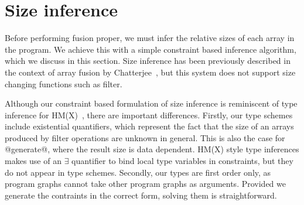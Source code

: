 \section{Size inference}
Before performing fusion proper, we must infer the relative sizes of each array in the program. We achieve this with a simple constraint based inference algorithm, which we discuss in this section. Size inference has been previously described in the context of array fusion by Chatterjee~\cite{chatterjee1991size}, but this system does not support size changing functions such as filter.

Although our constraint based formulation of size inference is reminiscent of type inference for HM(X)~\cite{odersky1999type}, there are important differences. Firstly, our type schemes include existential quantifiers, which represent the fact that the size of an arrays produced by filter operations are unknown in general. This is also the case for @generate@, where the result size is data dependent. HM(X) style type inferences makes use of an $\exists$ quantifier to bind local type variables in constraints, but they do not appear in type schemes. Secondly, our types are first order only, as program graphs cannot take other program graphs as arguments. Provided we generate the contraints in the correct form, solving them is straightforward.




